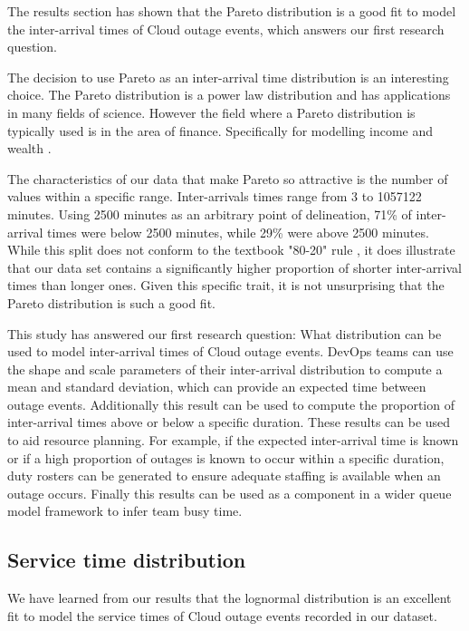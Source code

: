 \documentclass[5p]{elsarticle}
\begin{document}
The results section has shown that the Pareto distribution is a good fit to model the inter-arrival times of Cloud outage events, which answers our first research question.

The decision to use Pareto as an inter-arrival time distribution is an interesting choice. The Pareto distribution is a power law distribution and has applications in many fields of science. However the field where a Pareto distribution is typically used is in the area of finance. Specifically for modelling income and wealth \cite{arnold2015pareto}. 

The characteristics of our data that make Pareto so attractive is the number of values within a specific range. Inter-arrivals times range from 3 to 1057122 minutes. Using 2500 minutes as an arbitrary point of delineation, 71\% of inter-arrival times were below 2500 minutes, while 29\% were above 2500 minutes. While this split does not conform to the textbook "80-20" rule \cite{chen1993theoretical}, it does illustrate that our data set contains a significantly higher proportion of shorter inter-arrival times than longer ones. Given this specific trait, it is not unsurprising that the Pareto distribution is such a good fit. 

This study has answered our first research question: What distribution can be used to model inter-arrival times of Cloud outage events. DevOps teams can use the shape and scale parameters of their inter-arrival distribution to compute a mean and standard deviation, which can provide an expected time between outage events. Additionally this result can be used to compute the proportion of inter-arrival times above or below a specific duration. These results can be used to aid resource planning. For example, if the expected inter-arrival time is known or if a high proportion of outages is known to occur within a specific duration, duty rosters can be generated to ensure adequate staffing is available when an outage occurs. Finally this results can be used as a component in a wider queue model framework to infer team busy time.

\subsection{Service time distribution}

We have learned from our results that the lognormal distribution is an excellent fit to model the service times of Cloud outage events recorded in our dataset. 
\end{document}
